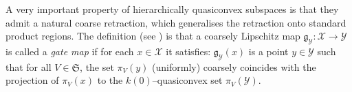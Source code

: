 \documentclass[11pt,oneside]{amsart}
\newtheorem{lem}[thm]{Lemma}
\theoremstyle{definition}
\newcommand{\cuco}[1]{{\mathcal #1}}
\newcommand{\fontact}{{\mathcal C}}
\newcommand{\gate}{\mathfrak g}
\begin{document}
% 
% 
%  
% 
% 
% 
% 
% 


A very important property of hierarchically quasiconvex subspaces is that they admit a natural coarse retraction, which generalises the retraction onto standard product regions. The definition (see \cite[Definition 5.4]{HHS2}) is that a coarsely Lipschitz map 
$\gate_{\cuco Y}\colon\cuco X\to\cuco Y$ is called a \emph{gate map} 
if for each $x\in\cuco X$ it satisfies:  $\gate_{\cuco
Y}(x)$ is a point $y\in\cuco Y$ 
such that for all $V\in\mathfrak S$,
the set $\pi_V(y)$ (uniformly) coarsely coincides with the projection
of $\pi_V(x)$ to the $k(0)$--quasiconvex set $\pi_V(\cuco Y)$.
\end{document}
